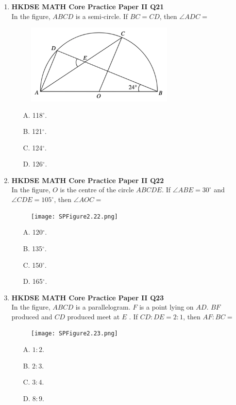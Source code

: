 \documentclass[12pt]{article}
\begin{document}
\begin{enumerate}
	\item \textbf{HKDSE MATH Core Practice Paper II Q21}\\
	In the figure, $ABCD$ is a semi-circle. If $BC = CD$, then $\angle ADC = $
	\begin{figure}[H]
		\centering
		\includegraphics[width = 0.7\textwidth]{PPFigure2.21.png}	
	\end{figure}
	\begin{enumerate}
		\item[A.] 118$^\circ$.
		\item[B.] 121$^\circ$.
		\item[C.] 124$^\circ$.
		\item[D.] 126$^\circ$.
	\end{enumerate}

	\item \textbf{HKDSE MATH Core Practice Paper II Q22}\\
	In the figure, $O$ is the centre of the circle $ABCDE$. If $\angle ABE = 30^\circ$ and $\angle CDE = 105^\circ$, then $\angle AOC = $
	\begin{figure}[H]
		\centering
		\texttt{[image: SPFigure2.22.png]}	
	\end{figure}
	\begin{enumerate}
		\item[A.] 120$^\circ$.
		\item[B.] 135$^\circ$.
		\item[C.] 150$^\circ$.
		\item[D.] 165$^\circ$.
	\end{enumerate}
	
	\item \textbf{HKDSE MATH Core Practice Paper II Q23}\\
	In the figure, $ABCD$ is a parallelogram. $F$ is a point lying on $AD$. $BF$ produced and $CD$ produced meet at $E$ . If $CD : DE = 2 : 1$, then $AF : BC =$
	\begin{figure}[H]
		\centering
		\texttt{[image: SPFigure2.23.png]}	
	\end{figure}
	\begin{enumerate}
		\item[A.] $1 : 2$.
		\item[B.] $2 : 3$.
		\item[C.] $3 : 4$.
		\item[D.] $8 : 9$.
	\end{enumerate}


\end{enumerate}
\end{document}
